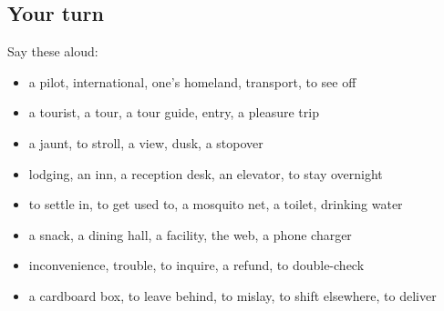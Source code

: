 \subsection*{Your turn}
Say these aloud:

\begin{itemize}
\raggedright
  \item a pilot, international, one's homeland, transport, to see off
  \item a tourist, a tour, a tour guide, entry, a pleasure trip
  \item a jaunt, to stroll, a view, dusk, a stopover
  \item lodging, an inn, a reception desk, an elevator, to stay overnight
  \item to settle in, to get used to, a mosquito net, a toilet, drinking water
  \item a snack, a dining hall, a facility, the web, a phone charger
  \item inconvenience, trouble, to inquire, a refund, to double-check
  \item a cardboard box, to leave behind, to mislay, to shift elsewhere, to deliver
\end{itemize}

